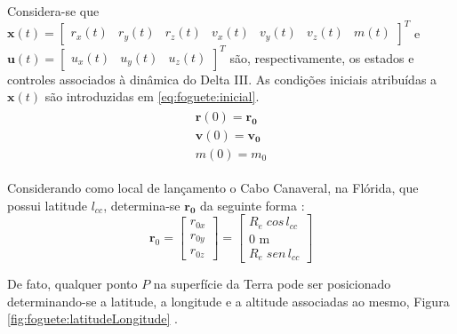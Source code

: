 Considera-se que $ \mathbf{x}(t) = \begin{bmatrix} r_x(t) & r_y(t) & r_z(t) & v_x(t) & v_y(t) & v_z(t) & m(t) \end{bmatrix}^T $ e $ \mathbf{u}(t) = \begin{bmatrix} u_x(t) & u_y(t) & u_z(t) \end{bmatrix}^T $ são, respectivamente, os estados e controles associados à dinâmica do Delta III. As condições iniciais atribuídas a $ \mathbf{x}(t) $ são introduzidas em \eqref{eq:foguete:inicial}.
%
\begin{gather}
	\label{eq:foguete:inicial}
		\begin{gathered}
			\mathbf{r}(0) = \mathbf{r_0} \\
			\mathbf{v}(0) = \mathbf{v_0} \\
			m(0) = m_0
		\end{gathered}	
\end{gather}

Considerando como local de lançamento o Cabo Canaveral, na Flórida, que possui latitude $ l_{cc} $, determina-se $ \mathbf{r_0} $ da seguinte forma \cite{becerra_psopt_2019}:
%
\begin{equation}
	\label{eq:foguete:r0Calculo}
	\mathbf{r}_0 = 
	\begin{bmatrix}
		r_{0x} \\
		r_{0y} \\
		r_{0z} 
	\end{bmatrix} = 
	\begin{bmatrix}
		R_e \; cos \, l_{cc} \\
		0 \text{ m}\\
		R_e \; sen \, l_{cc}
	\end{bmatrix} 
\end{equation}

De fato, qualquer ponto $ P $ na superfície da Terra pode ser posicionado determinando-se a latitude, a longitude e a altitude associadas ao mesmo, Figura \ref{fig:foguete:latitudeLongitude} \cite{britannica_escola_latitude_2020}.

